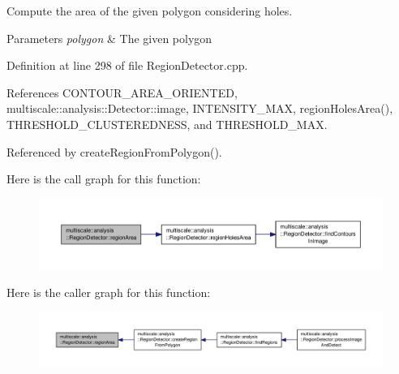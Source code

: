 Compute the area of the given polygon considering holes. 


\begin{DoxyParams}{Parameters}
{\em polygon} & The given polygon \\
\hline
\end{DoxyParams}


Definition at line 298 of file Region\-Detector.\-cpp.



References C\-O\-N\-T\-O\-U\-R\-\_\-\-A\-R\-E\-A\-\_\-\-O\-R\-I\-E\-N\-T\-E\-D, multiscale\-::analysis\-::\-Detector\-::image, I\-N\-T\-E\-N\-S\-I\-T\-Y\-\_\-\-M\-A\-X, region\-Holes\-Area(), T\-H\-R\-E\-S\-H\-O\-L\-D\-\_\-\-C\-L\-U\-S\-T\-E\-R\-E\-D\-N\-E\-S\-S, and T\-H\-R\-E\-S\-H\-O\-L\-D\-\_\-\-M\-A\-X.



Referenced by create\-Region\-From\-Polygon().



Here is the call graph for this function\-:
\nopagebreak
\begin{figure}[H]
\begin{center}
\leavevmode
\includegraphics[width=350pt]{classmultiscale_1_1analysis_1_1RegionDetector_a938fa8d165c87dc69e962883942072d2_cgraph}
\end{center}
\end{figure}




Here is the caller graph for this function\-:
\nopagebreak
\begin{figure}[H]
\begin{center}
\leavevmode
\includegraphics[width=350pt]{classmultiscale_1_1analysis_1_1RegionDetector_a938fa8d165c87dc69e962883942072d2_icgraph}
\end{center}
\end{figure}


